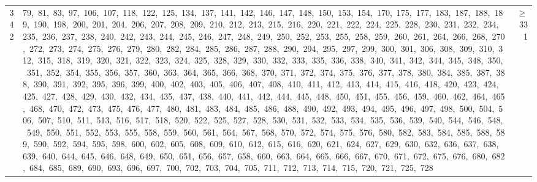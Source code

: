 \begin{longtable}{c|p{}|r}
342 & 79,\ 81,\ 83,\ 97,\ 106,\ 107,\ 118,\ 122,\ 125,\ 134,\ 137,\ 141,\ 142,\ 146,\ 147,\ 148,\ 150,\ 153,\ 154,\ 170,\ 175,\ 177,\ 183,\ 187,\ 188,\ 189,\ 190,\ 198,\ 200,\ 201,\ 204,\ 206,\ 207,\ 208,\ 209,\ 210,\ 212,\ 213,\ 215,\ 216,\ 220,\ 221,\ 222,\ 224,\ 225,\ 228,\ 230,\ 231,\ 232,\ 234,\ 235,\ 236,\ 237,\ 238,\ 240,\ 242,\ 243,\ 244,\ 245,\ 246,\ 247,\ 248,\ 249,\ 250,\ 252,\ 253,\ 255,\ 258,\ 259,\ 260,\ 261,\ 264,\ 266,\ 268,\ 270,\ 272,\ 273,\ 274,\ 275,\ 276,\ 279,\ 280,\ 282,\ 284,\ 285,\ 286,\ 287,\ 288,\ 290,\ 294,\ 295,\ 297,\ 299,\ 300,\ 301,\ 306,\ 308,\ 309,\ 310,\ 312,\ 315,\ 318,\ 319,\ 320,\ 321,\ 322,\ 323,\ 324,\ 325,\ 328,\ 329,\ 330,\ 332,\ 333,\ 335,\ 336,\ 338,\ 340,\ 341,\ 342,\ 344,\ 345,\ 348,\ 350,\ 351,\ 352,\ 354,\ 355,\ 356,\ 357,\ 360,\ 363,\ 364,\ 365,\ 366,\ 368,\ 370,\ 371,\ 372,\ 374,\ 375,\ 376,\ 377,\ 378,\ 380,\ 384,\ 385,\ 387,\ 388,\ 390,\ 391,\ 392,\ 395,\ 396,\ 399,\ 400,\ 402,\ 403,\ 405,\ 406,\ 407,\ 408,\ 410,\ 411,\ 412,\ 413,\ 414,\ 415,\ 416,\ 418,\ 420,\ 423,\ 424,\ 425,\ 427,\ 428,\ 429,\ 430,\ 432,\ 434,\ 435,\ 437,\ 438,\ 440,\ 441,\ 442,\ 444,\ 445,\ 448,\ 450,\ 451,\ 455,\ 456,\ 459,\ 460,\ 462,\ 464,\ 465,\ 468,\ 470,\ 472,\ 473,\ 475,\ 476,\ 477,\ 480,\ 481,\ 483,\ 484,\ 485,\ 486,\ 488,\ 490,\ 492,\ 493,\ 494,\ 495,\ 496,\ 497,\ 498,\ 500,\ 504,\ 506,\ 507,\ 510,\ 511,\ 513,\ 516,\ 517,\ 518,\ 520,\ 522,\ 525,\ 527,\ 528,\ 530,\ 531,\ 532,\ 533,\ 534,\ 535,\ 536,\ 539,\ 540,\ 544,\ 546,\ 548,\ 549,\ 550,\ 551,\ 552,\ 553,\ 555,\ 558,\ 559,\ 560,\ 561,\ 564,\ 567,\ 568,\ 570,\ 572,\ 574,\ 575,\ 576,\ 580,\ 582,\ 583,\ 584,\ 585,\ 588,\ 589,\ 590,\ 592,\ 594,\ 595,\ 598,\ 600,\ 602,\ 605,\ 608,\ 609,\ 610,\ 612,\ 615,\ 616,\ 620,\ 621,\ 624,\ 627,\ 629,\ 630,\ 632,\ 636,\ 637,\ 638,\ 639,\ 640,\ 644,\ 645,\ 646,\ 648,\ 649,\ 650,\ 651,\ 656,\ 657,\ 658,\ 660,\ 663,\ 664,\ 665,\ 666,\ 667,\ 670,\ 671,\ 672,\ 675,\ 676,\ 680,\ 682,\ 684,\ 685,\ 689,\ 690,\ 693,\ 696,\ 697,\ 700,\ 702,\ 703,\ 704,\ 705,\ 711,\ 712,\ 713,\ 714,\ 715,\ 720,\ 721,\ 725,\ 728 & $\ge$ 331 \\

\end{longtable}

